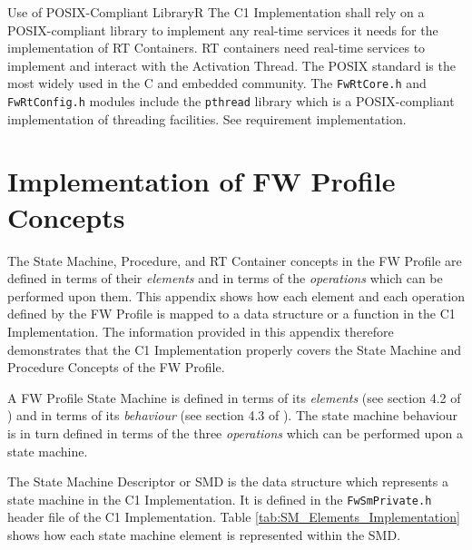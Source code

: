 \documentclass[a4paper,10pt]{article}
\let\stdsection\section
\renewcommand\section{\newpage\stdsection}
\newenvironment{fw_req}[6]
{\addtocounter{subsubsection}{1}
	\hspace{0.2cm}\textbf{FW-\arabic{section}.\arabic{subsection}.\arabic{subsubsection}/#2
	\hspace{0.8cm} #1}
	\vspace{-10pt}
\begin{longtable}{p{2.7cm}P{8.5cm}}
\hline
\textsc{Requirement} & #3 \\
\textsc{Justification} & #4 \\
\textsc{Implementation} & #5  \\ 
\textsc{Verification} & #6  \\
\hline
}
{\end{longtable}}
\begin{document}
\begin{fw_req}{Use of POSIX-Compliant Library}{R}
{The C1 Implementation shall rely on a POSIX-compliant library to implement any real-time services it needs for the implementation of RT Containers.}
{RT containers need real-time services to implement and interact with the Activation Thread. The POSIX standard is the most widely used in the C and embedded community. }
{The \texttt{FwRtCore.h} and \texttt{FwRtConfig.h} modules include the \texttt{pthread} library which is a POSIX-compliant implementation of threading facilities. } 
{See requirement implementation.}
\end{fw_req}


\setcounter{table}{0}	%

\appendix
\section{Implementation of FW Profile Concepts}
The State Machine, Procedure, and RT Container concepts in the FW Profile are defined in terms of their \emph{elements} and in terms of the \emph{operations} which can be performed upon them.
This appendix shows how each element and each operation defined by the FW Profile is 
mapped to a data structure or a function in the C1 Implementation.
The information provided in this appendix therefore demonstrates that the C1 Implementation properly covers the State Machine and Procedure Concepts of the FW Profile.

\label{Appendix_A_Implementation_SM_Concept}
A FW Profile State Machine is defined in terms of its \emph{elements} (see section 4.2 of
\cite{ref:fwprofile}) and in terms of its \emph{behaviour} (see section 4.3 of
\cite{ref:fwprofile}). 
The state machine behaviour is in turn defined in terms of the three \emph{operations} 
which can be performed upon a state machine. 

The State Machine Descriptor or SMD is the data structure which represents a state machine 
in the C1 Implementation.
It is defined in the \texttt{FwSmPrivate.h} header file of the C1 Implementation.
Table \ref{tab:SM_Elements_Implementation} shows how each state machine element is represented
within the SMD.
\end{document}
